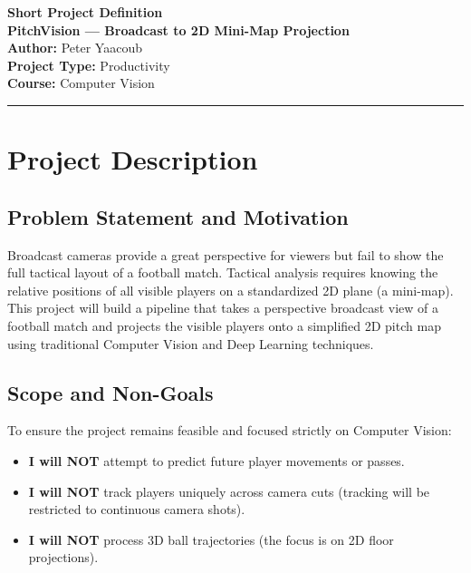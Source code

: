 \documentclass[11pt]{article}
\begin{document}
\begin{center}
    {\Large \textbf{Short Project Definition}} \\[0.2cm]
    {\LARGE \textbf{PitchVision — Broadcast to 2D Mini-Map Projection}} \\[0.4cm]
    \textbf{Author:} Peter Yaacoub \\
    \textbf{Project Type:} Productivity \\
    \textbf{Course:} Computer Vision
\end{center}
\vspace{0.2cm}
\hrule
\vspace{0.5cm}

\section{Project Description}

\subsection{Problem Statement and Motivation}
Broadcast cameras provide a great perspective for viewers but fail to show the full tactical layout of a football match. Tactical analysis requires knowing the relative positions of all visible players on a standardized 2D plane (a mini-map). This project will build a pipeline that takes a perspective broadcast view of a football match and projects the visible players onto a simplified 2D pitch map using traditional Computer Vision and Deep Learning techniques.

\subsection{Scope and Non-Goals}
To ensure the project remains feasible and focused strictly on Computer Vision:
\begin{itemize}[leftmargin=*]
    \item \textbf{I will NOT} attempt to predict future player movements or passes.
    \item \textbf{I will NOT} track players uniquely across camera cuts (tracking will be restricted to continuous camera shots).
    \item \textbf{I will NOT} process 3D ball trajectories (the focus is on 2D floor projections).
\end{itemize}
\end{document}

